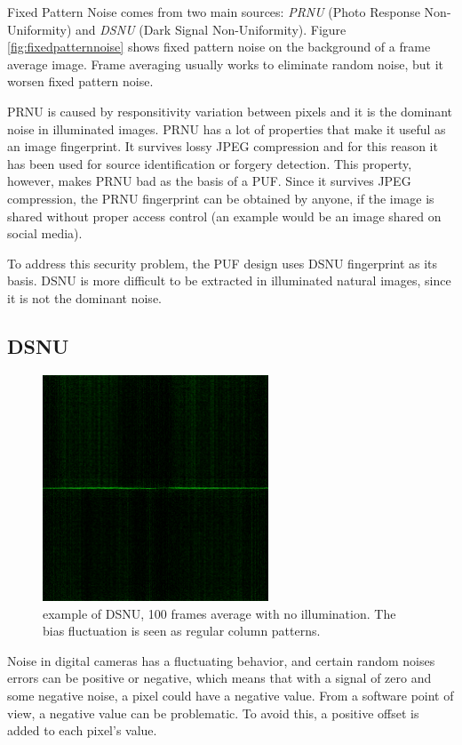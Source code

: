 Fixed Pattern Noise comes from two main sources: \textit{PRNU} (Photo Response Non-Uniformity) and \textit{DSNU} (Dark Signal Non-Uniformity).
Figure \ref{fig:fixedpatternnoise} shows fixed pattern noise on the background of a frame average image. Frame averaging usually works to eliminate random noise, but it worsen fixed pattern noise.

PRNU is caused by responsitivity variation between pixels and it is the dominant noise in illuminated images. PRNU has a lot of properties that make it useful as an image fingerprint.
It survives lossy JPEG compression and for this reason it has been used for source identification or forgery detection. This property, however, makes PRNU bad as the basis of a PUF.
Since it survives JPEG compression, the PRNU fingerprint can be obtained by anyone, if the image is shared without proper access control (an example would be an image shared on social media).

To address this security problem, the PUF design uses DSNU fingerprint as its basis. DSNU is more difficult to be extracted in illuminated natural images, since it is not the dominant noise.

\subsection{\textbf{DSNU}}
\begin{figure}[h!]                      %
    \centering
    \includegraphics[width=0.6\textwidth]{images/DSNU.png}
    \caption{example of DSNU, 100 frames average with no illumination. The bias fluctuation is seen as regular column patterns.}
    \label{fig:dsnu}
\end{figure}

Noise in digital cameras has a fluctuating behavior, and certain random noises errors can be positive or negative, which means that with a signal of zero and some negative noise, a pixel could have a negative value.
From a software point of view, a negative value can be problematic. To avoid this, a positive offset is added to each pixel's value.

